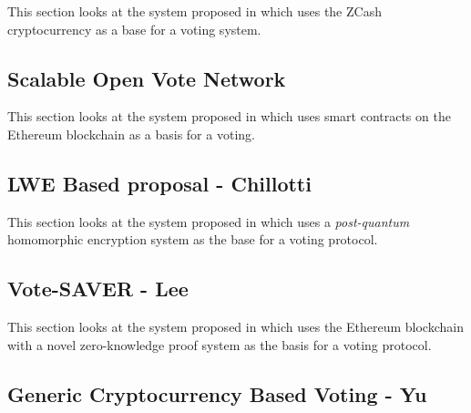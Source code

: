 This section looks at the system proposed in \cite{tarasovInternetVotingUsing2017} which uses the ZCash cryptocurrency as a base for a voting system.




\subsection{Scalable Open Vote Network}

This section looks at the system proposed in \cite{seifelnasrScalableOpenVoteNetwork2020} which uses smart contracts on the Ethereum blockchain as a basis for a voting.


\subsection{LWE Based proposal - Chillotti}

This section looks at the system proposed in \cite{chillottiHomomorphicLWEBased} which uses a \emph{post-quantum} homomorphic encryption system as the base for a voting protocol.


\subsection{Vote-SAVER - Lee}

This section looks at the system proposed in \cite{leeSAVERSNARKfriendlyAdditivelyhomomorphic2019} which uses the Ethereum blockchain with a novel zero-knowledge proof system as the basis for a voting protocol.


\subsection{Generic Cryptocurrency Based Voting - Yu}

